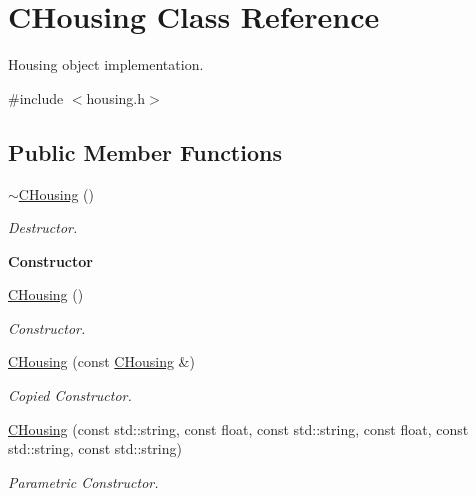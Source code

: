 \hypertarget{class_c_housing}{\section{C\+Housing Class Reference}
\label{class_c_housing}
}


Housing object implementation.  




{\ttfamily \#include $<$housing.\+h$>$}

\subsection*{Public Member Functions}
\begin{DoxyCompactItemize}
\item 
\hypertarget{class_c_housing_a474b50df1af45c52228c7404ab18c528}{\hyperlink{class_c_housing_a474b50df1af45c52228c7404ab18c528}{$\sim$\+C\+Housing} ()}\label{class_c_housing_a474b50df1af45c52228c7404ab18c528}

\begin{DoxyCompactList}\small\item\em Destructor. \end{DoxyCompactList}\end{DoxyCompactItemize}
\begin{Indent}{\bf Constructor}\par
\begin{DoxyCompactItemize}
\item 
\hyperlink{class_c_housing_a1cbe126cc3f747dc7587a80d992473d7}{C\+Housing} ()
\begin{DoxyCompactList}\small\item\em Constructor. \end{DoxyCompactList}\item 
\hyperlink{class_c_housing_a914bdcd23b728124b169406b072386f6}{C\+Housing} (const \hyperlink{class_c_housing}{C\+Housing} \&)
\begin{DoxyCompactList}\small\item\em Copied Constructor. \end{DoxyCompactList}\item 
\hyperlink{class_c_housing_a5c593d9bb321d6aea9999c083a121c0d}{C\+Housing} (const std\+::string, const float, const std\+::string, const float, const std\+::string, const std\+::string)
\begin{DoxyCompactList}\small\item\em Parametric Constructor. \end{DoxyCompactList}\end{DoxyCompactItemize}
\end{Indent}
